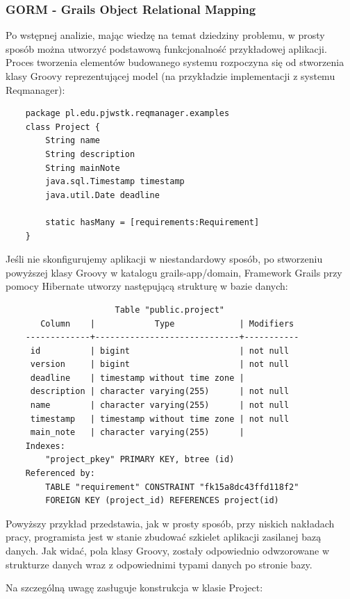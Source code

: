     \subsubsection{GORM - Grails Object Relational Mapping}
  
    Po wstępnej analizie, mając wiedzę na temat dziedziny problemu, w prosty sposób można utworzyć podstawową funkcjonalność przykładowej aplikacji. Proces tworzenia elementów budowanego systemu rozpoczyna się od stworzenia klasy Groovy reprezentującej model (na przykładzie implementacji z systemu Reqmanager):

    \begin{verbatim}
    package pl.edu.pjwstk.reqmanager.examples
    class Project {
        String name
        String description
        String mainNote
        java.sql.Timestamp timestamp
        java.util.Date deadline

        static hasMany = [requirements:Requirement]
    }
    \end{verbatim}

    Jeśli nie skonfigurujemy aplikacji w niestandardowy sposób, po stworzeniu powyższej klasy Groovy w katalogu grails-app/domain, Framework Grails przy pomocy Hibernate utworzy następującą strukturę w bazie danych:

    \begin{verbatim}
                      Table "public.project"
       Column    |            Type             | Modifiers 
    -------------+-----------------------------+-----------
     id          | bigint                      | not null
     version     | bigint                      | not null
     deadline    | timestamp without time zone | 
     description | character varying(255)      | not null
     name        | character varying(255)      | not null
     timestamp   | timestamp without time zone | not null
     main_note   | character varying(255)      | 
    Indexes:
        "project_pkey" PRIMARY KEY, btree (id)
    Referenced by:
        TABLE "requirement" CONSTRAINT "fk15a8dc43ffd118f2" 
        FOREIGN KEY (project_id) REFERENCES project(id)
    \end{verbatim}

    Powyższy przykład przedstawia, jak w prosty sposób, przy niskich nakładach pracy, programista jest w stanie zbudować szkielet aplikacji zasilanej bazą danych. Jak widać, pola klasy Groovy, zostały odpowiednio odwzorowane w strukturze danych wraz z odpowiednimi typami danych po stronie bazy.

    Na szczególną uwagę zasługuje konstrukcja w klasie Project: 

